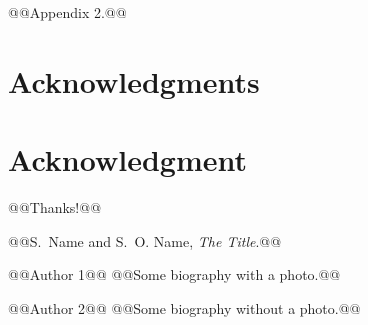 \documentclass[12pt,journal,compsoc]{IEEEtran}
\begin{document}
\section{}
@@Appendix 2.@@


\ifCLASSOPTIONcompsoc%
  \section*{Acknowledgments}
\else%
  \section*{Acknowledgment}
\fi%

@@Thanks!@@

\ifCLASSOPTIONcaptionsoff%
  \newpage
\fi%
\begin{thebibliography}{1}

@@S.~Name and S.~O. Name, \emph{The Title}.@@
\end{thebibliography}

\begin{IEEEbiography}{@@Author 1@@}
@@Some biography with a photo.@@
\end{IEEEbiography}

\begin{IEEEbiographynophoto}{@@Author 2@@}
@@Some biography without a photo.@@
\end{IEEEbiographynophoto}

\end{document}
